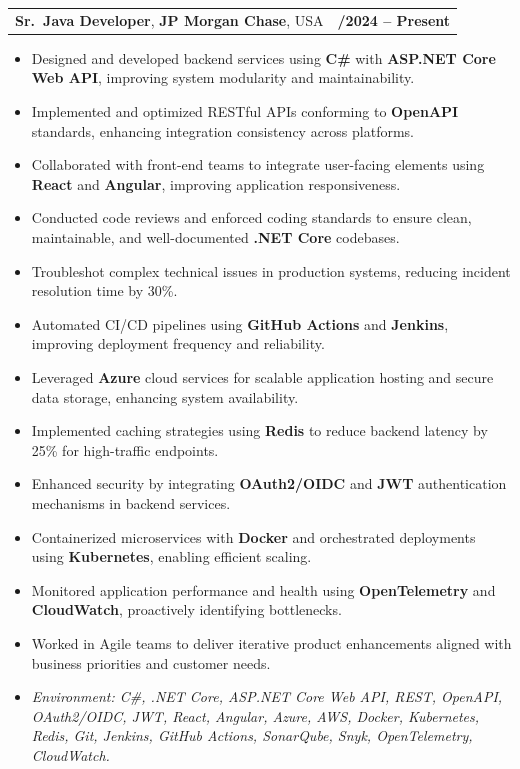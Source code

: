 \documentclass[letterpaper,11pt]{article}
\makeatletter
\newcommand{\resumeItem}[1]{
  \item\footnotesize{
    {#1 \vspace{-2pt}}
  }
}
\newcommand{\resumeSubheading}[4]{
  \vspace{-2pt}\item
    \begin{tabular*}{1.0\textwidth}[t]{l@{\extracolsep{\fill}}r}
      \textbf{\fontsize{10pt}{14pt}\selectfont #3}, \textbf{\fontsize{10pt}{14pt}\selectfont #1}, \fontsize{10pt}{14pt}\selectfont #4 & \textbf{\fontsize{10pt}{14pt}\selectfont #2} \\
    \end{tabular*}\vspace{-7pt}
}
\newcommand{\resumeItemListStart}{\begin{itemize}[leftmargin=*]}
\newcommand{\resumeItemListEnd}{\end{itemize}\vspace{-5pt}}
\makeatother
\begin{document}
\resumeSubheading
{JP Morgan Chase}{09/2024 -- Present}
{Sr.\ Java Developer}{USA}
\resumeItemListStart
  \resumeItem{Designed and developed backend services using \textbf{C\#} with \textbf{ASP.NET Core Web API}, improving system modularity and maintainability.}
  \resumeItem{Implemented and optimized RESTful APIs conforming to \textbf{OpenAPI} standards, enhancing integration consistency across platforms.}
  \resumeItem{Collaborated with front-end teams to integrate user-facing elements using \textbf{React} and \textbf{Angular}, improving application responsiveness.}
  \resumeItem{Conducted code reviews and enforced coding standards to ensure clean, maintainable, and well-documented \textbf{.NET Core} codebases.}
  \resumeItem{Troubleshot complex technical issues in production systems, reducing incident resolution time by 30\%.}
  \resumeItem{Automated CI/CD pipelines using \textbf{GitHub Actions} and \textbf{Jenkins}, improving deployment frequency and reliability.}
  \resumeItem{Leveraged \textbf{Azure} cloud services for scalable application hosting and secure data storage, enhancing system availability.}
  \resumeItem{Implemented caching strategies using \textbf{Redis} to reduce backend latency by 25\% for high-traffic endpoints.}
  \resumeItem{Enhanced security by integrating \textbf{OAuth2/OIDC} and \textbf{JWT} authentication mechanisms in backend services.}
  \resumeItem{Containerized microservices with \textbf{Docker} and orchestrated deployments using \textbf{Kubernetes}, enabling efficient scaling.}
  \resumeItem{Monitored application performance and health using \textbf{OpenTelemetry} and \textbf{CloudWatch}, proactively identifying bottlenecks.}
  \resumeItem{Worked in Agile teams to deliver iterative product enhancements aligned with business priorities and customer needs.}
  \resumeItem{\textit{Environment: C\#, .NET Core, ASP.NET Core Web API, REST, OpenAPI, OAuth2/OIDC, JWT, React, Angular, Azure, AWS, Docker, Kubernetes, Redis, Git, Jenkins, GitHub Actions, SonarQube, Snyk, OpenTelemetry, CloudWatch.}}
\resumeItemListEnd
\end{document}
